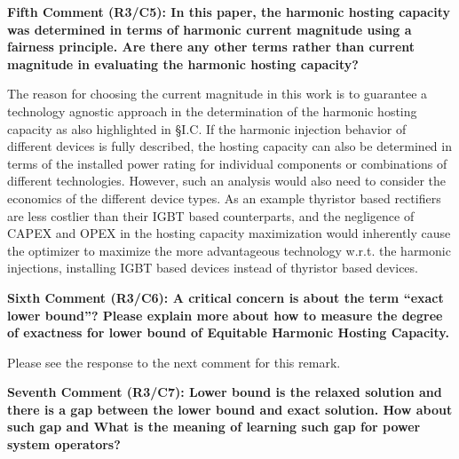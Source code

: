 \documentclass[10pt]{article}
\begin{document}
\textbf{Fifth Comment (R3/C5): In this paper, the harmonic hosting capacity was determined in terms of harmonic current magnitude using a fairness principle. Are there any other terms rather than current magnitude in evaluating the harmonic hosting capacity?}

\begin{tcolorbox}[colback=black!5!white,colframe=black]
The reason for choosing the current magnitude in this work is to guarantee a technology agnostic approach in the determination of the harmonic hosting capacity as also highlighted in \S I.C. If the harmonic injection behavior of different devices is fully described, the hosting capacity can also be determined in terms of the installed power rating for individual components or combinations of different technologies. However, such an analysis would also need to consider the economics of the different device types. As an example thyristor based rectifiers are less costlier than their IGBT based counterparts, and the negligence of CAPEX and OPEX in the hosting capacity maximization would inherently cause the optimizer to maximize the more advantageous technology w.r.t. the harmonic injections, installing IGBT based devices instead of thyristor based devices. 

\end{tcolorbox}

\textbf{Sixth Comment (R3/C6): A critical concern is about the term “exact lower bound”? Please explain more about how to measure the degree of exactness for lower bound of Equitable Harmonic Hosting Capacity.}

\begin{tcolorbox}[colback=black!5!white,colframe=black]

Please see the response to the next comment for this remark.

\end{tcolorbox}

\textbf{Seventh Comment (R3/C7): Lower bound is the relaxed solution and there is a gap between the lower bound and exact solution. How about such gap and What is the meaning of learning such gap for power system operators?}
\end{document}
